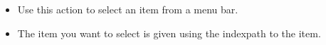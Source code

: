 \begin{itemize}
\item Use this action to select an item from a menu bar.
\item The item you want to select is given using the indexpath to the item.
\end{itemize}

